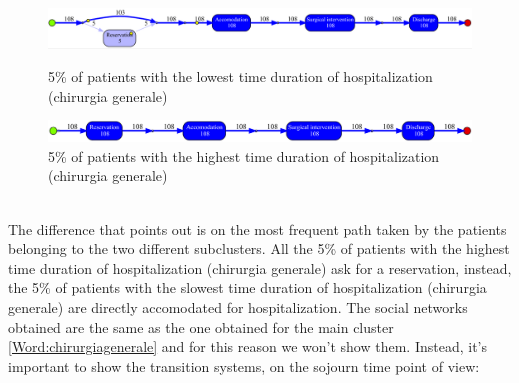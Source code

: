 \begin{figure} [htbp]
\includegraphics[width=\textwidth , keepaspectratio]{RicoveriInductiveVisualMiner0901Fast}
\caption{5\% of patients with the lowest time duration of hospitalization (chirurgia generale)}
\includegraphics[width=\textwidth , keepaspectratio]{RicoveriInductiveVisualMiner0901Slow}
\caption{5\% of patients with the highest time duration of hospitalization (chirurgia generale)}
\end{figure}\\
The difference that points out is on the most frequent path taken by the patients belonging to the two different subclusters. All the 5\% of patients with the highest time duration of hospitalization (chirurgia generale) ask for a reservation, instead, the 5\% of patients with the slowest time duration of hospitalization (chirurgia generale) are directly accomodated for hospitalization. The social networks obtained are the same as the one obtained for the main cluster \ref{Word:chirurgiagenerale} and for this reason we won't show them. Instead, it's important to show the transition systems, on the sojourn time point of view:
